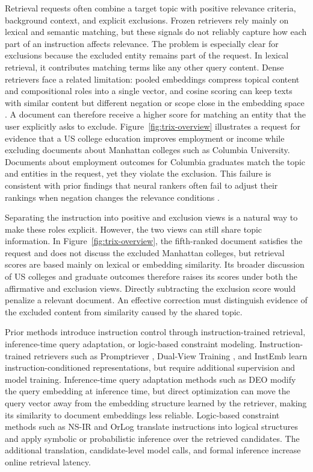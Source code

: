 \documentclass[letterpaper]{article}
\begin{document}
Retrieval requests often combine a target topic with positive relevance
criteria, background context, and explicit exclusions.  Frozen retrievers rely
mainly on lexical and semantic matching, but these signals do not reliably
capture how each part of an instruction affects relevance.  The problem is
especially clear for exclusions because the excluded entity remains part of
the request.  In lexical retrieval, it contributes matching terms like any
other query content.  Dense retrievers face a related limitation: pooled
embeddings compress topical content and compositional roles into a single
vector, and cosine scoring can keep texts with similar content but different
negation or scope close in the embedding space
\cite{DBLP:journals/corr/abs-2604-16351}.  A document can therefore receive a
higher score for matching an entity that the user explicitly asks to exclude.
Figure~\ref{fig:trix-overview} illustrates a request for evidence that a US
college education improves employment or income while excluding documents
about Manhattan colleges such as Columbia University.  Documents about
employment outcomes for Columbia graduates match the topic and entities in the
request, yet they violate the exclusion.  This failure is consistent with prior
findings that neural rankers often fail to adjust their rankings when negation
changes the relevance conditions
\cite{DBLP:conf/eacl/WellerLD24,DBLP:conf/naacl/WellerCMLCDLS25}.

Separating the instruction into positive and exclusion views is a natural way
to make these roles explicit.  However, the two views can still share topic
information.  In Figure~\ref{fig:trix-overview}, the fifth-ranked document
satisfies the request and does not discuss the excluded Manhattan colleges,
but retrieval scores are based mainly on lexical or embedding similarity.
Its broader discussion of US colleges and graduate outcomes therefore raises
its scores under both the affirmative and exclusion views.  Directly
subtracting the exclusion score would penalize a relevant document.  An
effective correction must distinguish evidence of the excluded content from
similarity caused by the shared topic.

Prior methods introduce instruction control through instruction-trained
retrieval, inference-time query adaptation, or logic-based constraint
modeling.  Instruction-trained retrievers such as Promptriever
\cite{DBLP:conf/iclr/WellerDLPZH25}, Dual-View Training \cite{dualview2026}, and
InstEmb \cite{gao2026instemb} learn instruction-conditioned representations,
but require additional supervision and model training.  Inference-time query
adaptation methods such as DEO
\cite{DBLP:journals/corr/abs-2603-09185} modify the query embedding at
inference time, but direct optimization can move the query vector away from
the embedding structure learned by the retriever, making its similarity to
document embeddings less reliable.  Logic-based constraint methods such as NS-IR
\cite{xu2025logical} and OrLog \cite{hoveyda2026orlog} translate instructions
into logical structures and apply symbolic or probabilistic inference over the
retrieved candidates.  The additional translation, candidate-level model
calls, and formal inference increase online retrieval latency.
\end{document}
